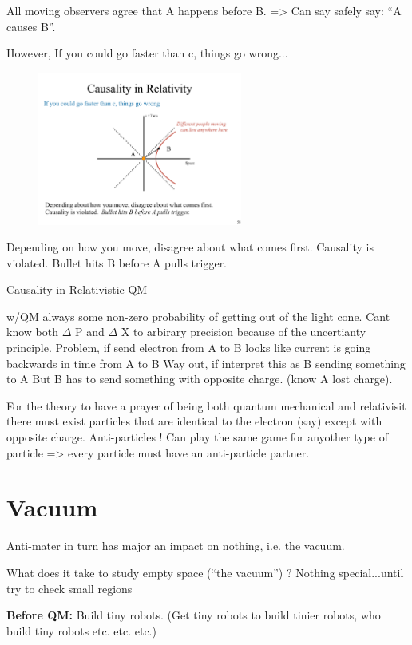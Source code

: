 All moving observers agree that A happens before B. => Can say safely say: ``A causes B''.


However, If you could go faster than c, things go wrong...
\begin{figure}[h]
\centering
\includegraphics[width=0.6\textwidth]{./CausalitySpacelike.pdf}
\end{figure}

Depending on how you move, disagree about what comes first. Causality is violated. Bullet hits B before A pulls trigger.

\clearpage
\underline{Causality in Relativistic QM}

w/QM always some non-zero probability of getting out of the light cone.
Cant know both $\Delta$ P and $\Delta$ X to arbirary precision because of the uncertianty principle.
Problem, if send electron from A to B looks like current is going backwards in time from A to B
Way out, if interpret this as B sending something to A
But B has to send something with opposite charge. (know A lost charge).

For the theory to have a prayer of being both quantum mechanical and relativisit there must exist particles that are identical to the electron (say) except with opposite charge.
Anti-particles !
Can play the same game for anyother type of particle => every particle must have an anti-particle partner.

\section{Vacuum}
Anti-mater in turn has major an impact on nothing, i.e. the vacuum.

What does it take to study empty space (“the vacuum”) ?
Nothing special...until try to check small regions

\textbf{Before QM:}
Build tiny robots. (Get tiny robots to build tinier robots, who build tiny robots etc. etc. etc.)


